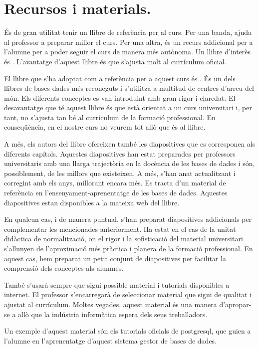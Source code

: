 \documentclass[catalan, a4paper, 12pt, titlepage]{article}
\begin{document}
\section{Recursos i materials.}

És de gran utilitat tenir un llibre de referència per al curs.
Per una banda, ajuda al professor a preparar millor el curs.
Per una altra, és un recurs addicional per a l'alumne per a poder seguir el curs de manera més autònoma.
Un llibre d'interès és \cite{montalban2014}.
L'avantatge d'aquest llibre és que s'ajusta molt al currículum oficial.

El llibre que s'ha adoptat com a referència per a aquest curs és \cite{silbershatz2020}.
És un dels llibres de bases dades més reconeguts i s'utilitza a multitud de centres d'arreu del món.
Els diferents conceptes es van introduint amb gran rigor i claredat.
El desavantatge que té aquest llibre és que està orientat a un curs universitari i, per tant, no s'ajusta tan bé al currículum de la formació professional.
En conseqüència, en el nostre curs no veurem tot allò que és al llibre.

A més, els autors del llibre ofereixen també les diapositives que es corresponen als diferents capítols.
Aquestes diapositives han estat preparades per professors universitaris amb una llarga trajectòria en la docència de les bases de dades i són, possiblement, de les millors que existeixen.
A més, s'han anat actualitzant i corregint amb els anys, millorant encara més.
Es tracta d'un material de referència en l'ensenyament-aprenentatge de les bases de dades.
Aquestes diapositives estan disponibles a la mateixa web del llibre.

En qualcun cas, i de manera puntual, s'han preparat diapositives addicionals per complementar les mencionades anteriorment.
Ha estat en el cas de la unitat didàctica de normalització, on el rigor i la sofisticació del material universitari s'allunyen de l'aproximació més pràctica i planera de la formació professional.
En aquest cas, hem preparat un petit conjunt de diapositives per facilitar la comprensió dels conceptes als alumnes.

També s'usarà sempre que sigui possible material i tutorials disponibles a internet. 
El professor s'encarregarà de seleccionar material que sigui de qualitat i ajustat al currículum.
Moltes vegades, aquest material és una manera d'apropar-se a allò que la indústria informàtica espera dels seus treballadors.

Un exemple d'aquest material són els tutorials oficials de postgresql, que guien a l'alumne en l'aprenentatge d'aquest sistema gestor de bases de dades.
\end{document}
